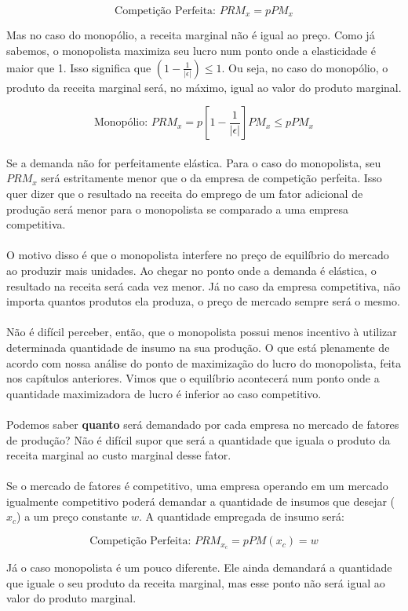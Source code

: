 \documentclass[a4paper,11pt,oneside]{book}
\theoremstyle{definition}
\theoremstyle{break}
\begin{document}
$$ \textrm{Competição Perfeita: } PRM_x = p PM_x $$

Mas no caso do monopólio, a receita marginal não é igual ao preço. Como já sabemos, o monopolista maximiza seu lucro num ponto onde a elasticidade é maior que 1. Isso significa que $\left( 1 - \frac{1}{|\epsilon|} \right) \leq 1 $. Ou seja, no caso do monopólio, o produto da receita marginal será, no máximo, igual ao valor do produto marginal.

$$ \textrm{Monopólio: } PRM_x = p \left[ 1 - \frac{1}{|\epsilon|} \right] PM_x \leq pPM_x $$
\\
Se a demanda não for perfeitamente elástica. Para o caso do monopolista, seu $PRM_x$ será estritamente menor que o da empresa de competição perfeita. Isso quer dizer que o resultado na receita do emprego de um fator adicional de produção será menor para o monopolista se comparado a uma empresa competitiva.
\\
\\
O motivo disso é que o monopolista interfere no preço de equilíbrio do mercado ao produzir mais unidades. Ao chegar no ponto onde a demanda é elástica, o resultado na receita será cada vez menor. Já no caso da empresa competitiva, não importa quantos produtos ela produza, o preço de mercado sempre será o mesmo.
\\
\\
Não é difícil perceber, então, que o monopolista possui menos incentivo à utilizar determinada quantidade de insumo na sua produção. O que está plenamente de acordo com nossa análise do ponto de maximização do lucro do monopolista, feita nos capítulos anteriores. Vimos que o equilíbrio acontecerá num ponto onde a quantidade maximizadora de lucro é inferior ao caso competitivo.
\\
\\
Podemos saber \textbf{quanto} será demandado por cada empresa no mercado de fatores de produção? Não é difícil supor que será a quantidade que iguala o produto da receita marginal ao custo marginal desse fator.
\\
\\
Se o mercado de fatores é competitivo, uma empresa operando em um mercado igualmente competitivo poderá demandar a quantidade de insumos que desejar ($x_c$) a um preço constante $w$. A quantidade empregada de insumo será:

$$ \textrm{Competição Perfeita: } PRM_{x_c} = pPM(x_c) = w $$

Já o caso monopolista é um pouco diferente. Ele ainda demandará a quantidade que iguale o seu produto da receita marginal, mas esse ponto não será igual ao valor do produto marginal.
\end{document}
